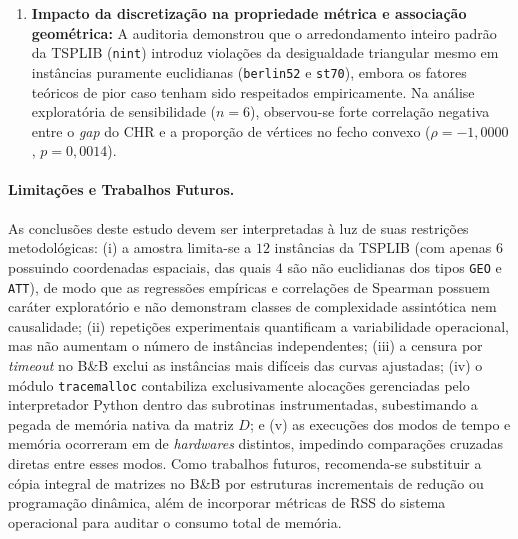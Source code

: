 \documentclass[12pt]{article}
\begin{document}
\begin{enumerate}
    \item \textbf{Impacto da discretização na propriedade métrica e associação geométrica:} A auditoria demonstrou que o arredondamento inteiro padrão da TSPLIB (\texttt{nint}) introduz violações da desigualdade triangular mesmo em instâncias puramente euclidianas (\texttt{berlin52} e \texttt{st70}), embora os fatores teóricos de pior caso tenham sido respeitados empiricamente. Na análise exploratória de sensibilidade ($n=6$), observou-se forte correlação negativa entre o \textit{gap} do CHR e a proporção de vértices no fecho convexo ($\rho = -1{,}0000$, $p = 0{,}0014$).
\end{enumerate}

\paragraph{Limitações e Trabalhos Futuros.} As conclusões deste estudo devem ser interpretadas à luz de suas restrições metodológicas: (i) a amostra limita-se a $12$ instâncias da TSPLIB (com apenas $6$ possuindo coordenadas espaciais, das quais $4$ são não euclidianas dos tipos \texttt{GEO} e \texttt{ATT}), de modo que as regressões empíricas e correlações de Spearman possuem caráter exploratório e não demonstram classes de complexidade assintótica nem causalidade; (ii) repetições experimentais quantificam a variabilidade operacional, mas não aumentam o número de instâncias independentes; (iii) a censura por \textit{timeout} no B\&B exclui as instâncias mais difíceis das curvas ajustadas; (iv) o módulo \texttt{tracemalloc} contabiliza exclusivamente alocações gerenciadas pelo interpretador Python dentro das subrotinas instrumentadas, subestimando a pegada de memória nativa da matriz $D$; e (v) as execuções dos modos de tempo e memória ocorreram em de \textit{hardwares} distintos, impedindo comparações cruzadas diretas entre esses modos. Como trabalhos futuros, recomenda-se substituir a cópia integral de matrizes no B\&B por estruturas incrementais de redução ou programação dinâmica, além de incorporar métricas de RSS do sistema operacional para auditar o consumo total de memória.


\end{document}
